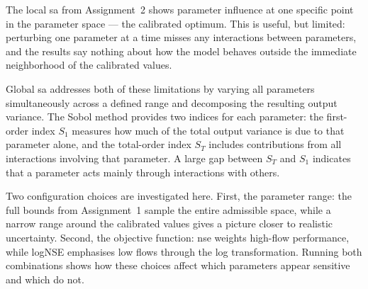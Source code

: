 The local \ac{sa} from Assignment~2 shows parameter influence at one specific point in the parameter space --- the calibrated optimum. This is useful, but limited: perturbing one parameter at a time misses any interactions between parameters, and the results say nothing about how the model behaves outside the immediate neighborhood of the calibrated values.

Global \ac{sa} addresses both of these limitations by varying all parameters simultaneously across a defined range and decomposing the resulting output variance. The Sobol method \autocite{Saltelli.2002} provides two indices for each parameter: the first-order index $S_1$ measures how much of the total output variance is due to that parameter alone, and the total-order index $S_T$ includes contributions from all interactions involving that parameter. A large gap between $S_T$ and $S_1$ indicates that a parameter acts mainly through interactions with others.

Two configuration choices are investigated here. First, the parameter range: the full bounds from Assignment~1 sample the entire admissible space, while a narrow range around the calibrated values gives a picture closer to realistic uncertainty. Second, the objective function: \ac{nse} weights high-flow performance, while logNSE emphasises low flows through the log transformation. Running both combinations shows how these choices affect which parameters appear sensitive and which do not.
